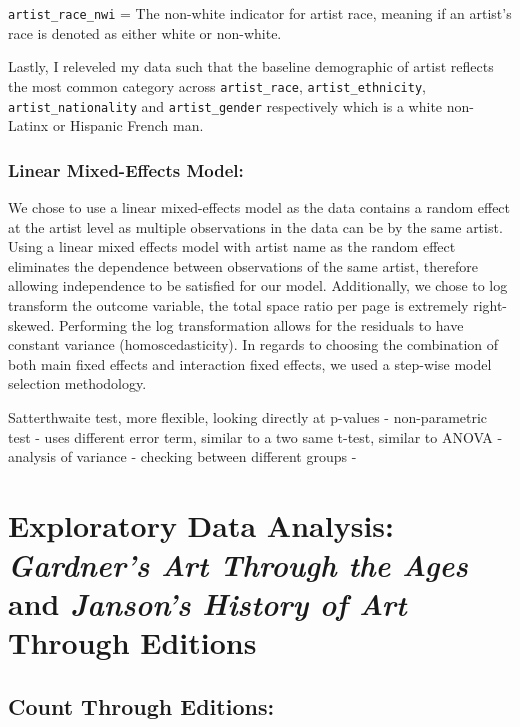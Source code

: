 \documentclass[
  letterpaper,
  DIV=11,
  numbers=noendperiod]{scrreprt}
\begin{document}
\texttt{artist\_race\_nwi} = The non-white indicator for artist race,
meaning if an artist's race is denoted as either white or non-white.

Lastly, I releveled my data such that the baseline demographic of artist
reflects the most common category across \texttt{artist\_race},
\texttt{artist\_ethnicity}, \texttt{artist\_nationality} and
\texttt{artist\_gender} respectively which is a white non-Latinx or
Hispanic French man.

\hypertarget{linear-mixed-effects-model}{%
\subsection{Linear Mixed-Effects
Model:}\label{linear-mixed-effects-model}}

We chose to use a linear mixed-effects model as the data contains a
random effect at the artist level as multiple observations in the data
can be by the same artist. Using a linear mixed effects model with
artist name as the random effect eliminates the dependence between
observations of the same artist, therefore allowing independence to be
satisfied for our model. Additionally, we chose to log transform the
outcome variable, the total space ratio per page is extremely
right-skewed. Performing the log transformation allows for the residuals
to have constant variance (homoscedasticity). In regards to choosing the
combination of both main fixed effects and interaction fixed effects, we
used a step-wise model selection methodology.

Satterthwaite test, more flexible, looking directly at p-values -
non-parametric test - uses different error term, similar to a two same
t-test, similar to ANOVA - analysis of variance - checking between
different groups -

\hypertarget{exploratory-data-analysis-gardners-art-through-the-ages-and-jansons-history-of-art-through-editions}{%
\chapter{\texorpdfstring{Exploratory Data Analysis: \emph{Gardner's Art
Through the Ages} and \emph{Janson's History of Art} Through
Editions}{Exploratory Data Analysis: Gardner's Art Through the Ages and Janson's History of Art Through Editions}}\label{exploratory-data-analysis-gardners-art-through-the-ages-and-jansons-history-of-art-through-editions}}

\hypertarget{count-through-editions}{%
\section{\texorpdfstring{\textbf{Count Through
Editions:}}{Count Through Editions:}}\label{count-through-editions}}
\end{document}
